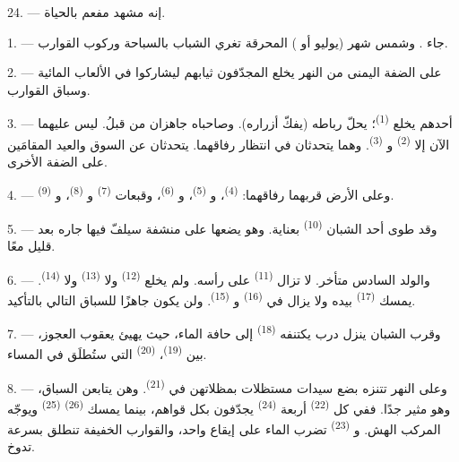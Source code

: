 24. --- إنه مشهد مفعم بالحياة.
\VUsaut{4.0mm}

\VUsaut{3.0mm}

\VUsaut{2.4mm}

\VUsaut{3.0mm}

1. --- جاء . وشمس شهر  (يوليو أو
) المحرقة تغري الشباب بالسباحة وركوب القوارب.

2. --- على الضفة اليمنى من النهر يخلع المجدّفون ثيابهم ليشاركوا في
الألعاب المائية وسباق القوارب.

3. --- أحدهم يخلع  \textsuperscript{(1)}؛ يحلّ رباطه (يفكّ أزراره).
وصاحباه جاهزان من قبلُ. ليس عليهما الآن إلا 
\textsuperscript{(2)} و \textsuperscript{(3)}. وهما يتحدثان في
انتظار رفاقهما. يتحدثان عن السوق والعيد المقامَين على الضفة الأخرى.

4. --- وعلى الأرض قربهما  رفاقهما: 
 \textsuperscript{(4)}، و \textsuperscript{(5)}،
و \textsuperscript{(6)}، وقبعات  \textsuperscript{(7)}
و \textsuperscript{(8)}، و \textsuperscript{(9)}.

5. --- وقد طوى أحد الشبان  \textsuperscript{(10)} بعناية. وهو
يضعها على منشفة سيلفّ فيها جاره بعد قليل  معًا.

6. --- والولد السادس متأخر. لا تزال  \textsuperscript{(11)} على
رأسه. ولم يخلع  \textsuperscript{(12)} ولا 
\textsuperscript{(13)} ولا  \textsuperscript{(14)}. يمسك
 \textsuperscript{(17)} بيده ولا يزال في 
\textsuperscript{(16)} و \textsuperscript{(15)}. ولن يكون جاهزًا
للسباق التالي بالتأكيد.

7. --- وقرب الشبان ينزل درب يكتنفه  \textsuperscript{(18)} إلى حافة
الماء، حيث يهيئ يعقوب العجوز، بين  \textsuperscript{(19)}،
 \textsuperscript{(20)} التي ستُطلَق في المساء.

\VUsaut{4.4mm}
\VUsaut{3.4mm}

8. --- وعلى النهر تتنزه بضع سيدات مستظلات بمظلاتهن في 
\textsuperscript{(21)}. وهن يتابعن السباق، وهو مثير جدًا. ففي كل  \textsuperscript{(22)} أربعة  \textsuperscript{(24)} يجدّفون بكل
قواهم، بينما يمسك  \textsuperscript{(26)} 
\textsuperscript{(25)} ويوجّه المركب الهش. و \textsuperscript{(23)}
تضرب الماء على إيقاع واحد، والقوارب الخفيفة تنطلق بسرعة تدوخ.

